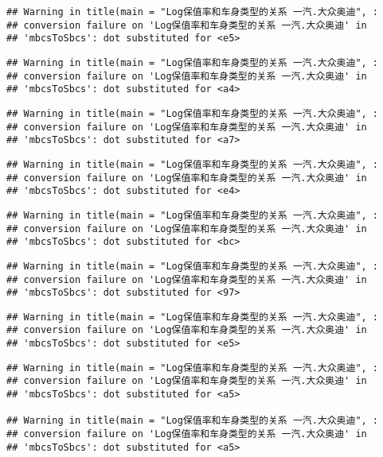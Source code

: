 \documentclass[]{article}
\begin{document}
\begin{verbatim}
## Warning in title(main = "Log保值率和车身类型的关系 一汽.大众奥迪", :
## conversion failure on 'Log保值率和车身类型的关系 一汽.大众奥迪' in
## 'mbcsToSbcs': dot substituted for <e5>
\end{verbatim}

\begin{verbatim}
## Warning in title(main = "Log保值率和车身类型的关系 一汽.大众奥迪", :
## conversion failure on 'Log保值率和车身类型的关系 一汽.大众奥迪' in
## 'mbcsToSbcs': dot substituted for <a4>
\end{verbatim}

\begin{verbatim}
## Warning in title(main = "Log保值率和车身类型的关系 一汽.大众奥迪", :
## conversion failure on 'Log保值率和车身类型的关系 一汽.大众奥迪' in
## 'mbcsToSbcs': dot substituted for <a7>
\end{verbatim}

\begin{verbatim}
## Warning in title(main = "Log保值率和车身类型的关系 一汽.大众奥迪", :
## conversion failure on 'Log保值率和车身类型的关系 一汽.大众奥迪' in
## 'mbcsToSbcs': dot substituted for <e4>
\end{verbatim}

\begin{verbatim}
## Warning in title(main = "Log保值率和车身类型的关系 一汽.大众奥迪", :
## conversion failure on 'Log保值率和车身类型的关系 一汽.大众奥迪' in
## 'mbcsToSbcs': dot substituted for <bc>
\end{verbatim}

\begin{verbatim}
## Warning in title(main = "Log保值率和车身类型的关系 一汽.大众奥迪", :
## conversion failure on 'Log保值率和车身类型的关系 一汽.大众奥迪' in
## 'mbcsToSbcs': dot substituted for <97>
\end{verbatim}

\begin{verbatim}
## Warning in title(main = "Log保值率和车身类型的关系 一汽.大众奥迪", :
## conversion failure on 'Log保值率和车身类型的关系 一汽.大众奥迪' in
## 'mbcsToSbcs': dot substituted for <e5>
\end{verbatim}

\begin{verbatim}
## Warning in title(main = "Log保值率和车身类型的关系 一汽.大众奥迪", :
## conversion failure on 'Log保值率和车身类型的关系 一汽.大众奥迪' in
## 'mbcsToSbcs': dot substituted for <a5>

## Warning in title(main = "Log保值率和车身类型的关系 一汽.大众奥迪", :
## conversion failure on 'Log保值率和车身类型的关系 一汽.大众奥迪' in
## 'mbcsToSbcs': dot substituted for <a5>
\end{verbatim}
\end{document}
